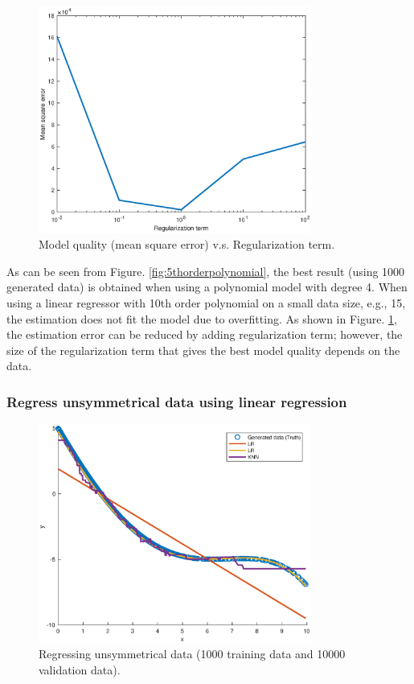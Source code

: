 \documentclass[]{article}
\begin{document}
\begin{figure}[H]
	\caption{Model quality (mean square error) v.s. Regularization term.}
	\label{fig:regularization}
	\centering
	\includegraphics[width=0.8\textwidth]{project32b2}
\end{figure}

As can be seen from Figure. \ref{fig:5thorderpolynomial}, the best result (using 1000 generated data) is obtained when using a polynomial model with degree 4. When using a linear regressor with 10th order polynomial on a small data size, e.g., 15, the estimation does not fit the model due to overfitting. As shown in Figure. \ref{fig:regularization}, the estimation error can be reduced by adding regularization term; however, the size of the regularization term that gives the best model quality depends on the data.

\subsubsection{Regress unsymmetrical data using linear regression}
\begin{figure}[H]
	\caption{Regressing unsymmetrical data (1000 training data and 10000 validation data).}
	\label{fig:unsymmetrical}
	\centering
	\includegraphics[width=0.8\textwidth]{project32c}
\end{figure}
\end{document}
